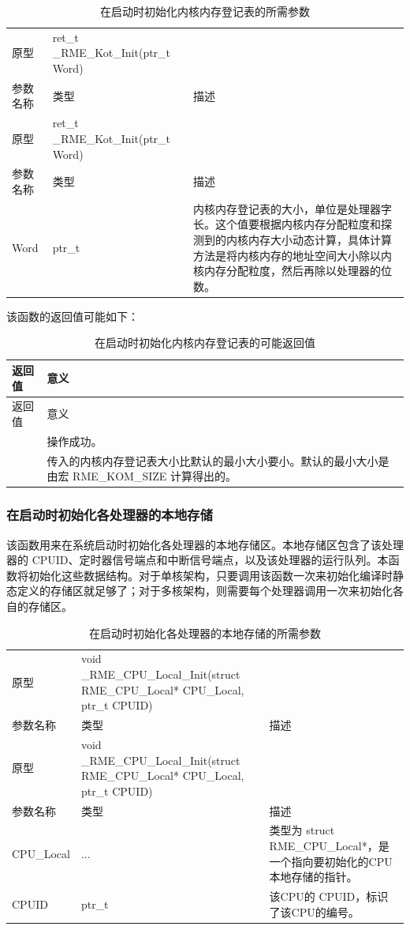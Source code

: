 \begin{xltabular}{\textwidth}{@{}>{\hsize\raggedright\arraybackslash}X>{\hsize\raggedright\arraybackslash}X>{\hsize\raggedright\arraybackslash}X@{}}
\caption{在启动时初始化内核内存登记表的所需参数}\label{tab:7-38-init-kernel-object-table-at-boot-parameters}\\
\toprule
原型 & ret\_t \_RME\_Kot\_Init(ptr\_t Word) &\tabularnewline
参数名称 & 类型 & 描述\tabularnewline
\endfirsthead
\toprule
原型 & ret\_t \_RME\_Kot\_Init(ptr\_t Word) &\tabularnewline
参数名称 & 类型 & 描述\tabularnewline
\midrule
\endhead
\bottomrule
\endlastfoot
Word & ptr\_t &
内核内存登记表的大小，单位是处理器字长。这个值要根据内核内存分配粒度和探测到的内核内存大小动态计算，具体计算方法是将内核内存的地址空间大小除以内核内存分配粒度，然后再除以处理器的位数。\tabularnewline
\end{xltabular}

该函数的返回值可能如下：

\begin{xltabular}{\textwidth}{@{}>{\hsize\raggedright\arraybackslash}X>{\hsize\raggedright\arraybackslash}X@{}}
\caption{在启动时初始化内核内存登记表的可能返回值}\label{tab:7-39-init-kernel-object-table-at-boot-return-values}\\
\toprule
返回值 & 意义\tabularnewline
\endfirsthead
\toprule
返回值 & 意义\tabularnewline
\midrule
\endhead
\bottomrule
{} & 操作成功。 & 传入的内核内存登记表大小比默认的最小大小要小。默认的最小大小是由宏 RME\_KOM\_SIZE 计算得出的。\tabularnewline
\end{xltabular}

\subsubsection{在启动时初始化各处理器的本地存储}\label{subsubsec:7-init-cpu-local-storage-at-boot}

该函数用来在系统启动时初始化各处理器的本地存储区。本地存储区包含了该处理器的 CPUID、定时器信号端点和中断信号端点，以及该处理器的运行队列。本函数将初始化这些数据结构。对于单核架构，只要调用该函数一次来初始化编译时静态定义的存储区就足够了；对于多核架构，则需要每个处理器调用一次来初始化各自的存储区。

\begin{xltabular}{\textwidth}{@{}>{\hsize\raggedright\arraybackslash}X>{\hsize\raggedright\arraybackslash}X>{\hsize\raggedright\arraybackslash}X@{}}
\caption{在启动时初始化各处理器的本地存储的所需参数}\label{tab:7-40-init-cpu-local-storage-at-boot-parameters}\\
\toprule
原型 & void \_RME\_CPU\_Local\_Init(struct RME\_CPU\_Local* CPU\_Local,
ptr\_t CPUID) &\tabularnewline
参数名称 & 类型 & 描述\tabularnewline
\endfirsthead
\toprule
原型 & void \_RME\_CPU\_Local\_Init(struct RME\_CPU\_Local* CPU\_Local,
ptr\_t CPUID) &\tabularnewline
参数名称 & 类型 & 描述\tabularnewline
\midrule
\endhead
\bottomrule
\endlastfoot
CPU\_Local & ... &
类型为 struct RME\_CPU\_Local*，是一个指向要初始化的CPU本地存储的指针。\tabularnewline
CPUID & ptr\_t & 该CPU的 CPUID，标识了该CPU的编号。\tabularnewline
\end{xltabular}

